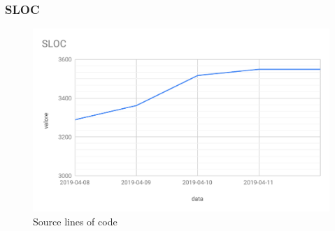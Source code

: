 
\subsubsection{SLOC}

\begin{figure}[H]
	\centering
	\includegraphics[scale=0.6]{res/images/RQ/sloc.pdf}
	\caption{Source lines of code}
\end{figure}



